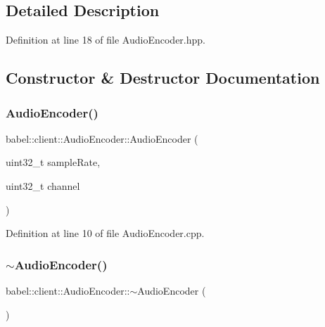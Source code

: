 \subsection{Detailed Description}


Definition at line 18 of file Audio\+Encoder.\+hpp.



\subsection{Constructor \& Destructor Documentation}
\mbox{\label{classbabel_1_1client_1_1_audio_encoder_a88fe732b0255dd5a9387d4379863d8e6}} 
\subsubsection{\texorpdfstring{Audio\+Encoder()}{AudioEncoder()}}
{\footnotesize\ttfamily babel\+::client\+::\+Audio\+Encoder\+::\+Audio\+Encoder (\begin{DoxyParamCaption}\item[{uint32\+\_\+t}]{sample\+Rate,  }\item[{uint32\+\_\+t}]{channel }\end{DoxyParamCaption})}



Definition at line 10 of file Audio\+Encoder.\+cpp.

\mbox{\label{classbabel_1_1client_1_1_audio_encoder_ac5aea5b49cc5f4f8ac7463f7d7ada87a}} 
\subsubsection{\texorpdfstring{$\sim$\+Audio\+Encoder()}{~AudioEncoder()}}
{\footnotesize\ttfamily babel\+::client\+::\+Audio\+Encoder\+::$\sim$\+Audio\+Encoder (\begin{DoxyParamCaption}{ }\end{DoxyParamCaption})\hspace{0.3cm}{\ttfamily [virtual]}}



